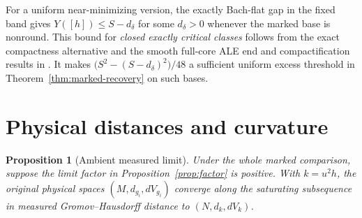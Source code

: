 \documentclass[11pt]{article}
\newtheorem{proposition}[theorem]{Proposition}
\theoremstyle{definition}
\theoremstyle{remark}
\begin{document}
For a uniform near-minimizing version, the exactly Bach-flat gap in
the fixed band gives \(Y([h])\le S-d_\delta\) for some \(d_\delta>0\)
whenever the marked base is nonround. This bound for \emph{closed
exactly critical classes} follows from the exact compactness
alternative and the smooth full-core ALE end and compactification
results in \cite[\S12.2]{Baker2026TwistorSections}. It makes
\(\big(S^2-(S-d_\delta)^2\big)/48\) a sufficient uniform excess
threshold in Theorem~\ref{thm:marked-recovery} on such bases.

\section{Physical distances and curvature}\label{sec:distance}

\begin{proposition}[Ambient measured limit]\label{prop:distance}
Under the whole marked comparison, suppose the limit factor in Proposition~\ref{prop:factor} is positive. With \(k=u^2h\), the original physical spaces \((M,d_{g_i},dV_{g_i})\) converge along the saturating subsequence in measured Gromov--Hausdorff distance to \((N,d_k,dV_k)\).
\end{proposition}
\end{document}
